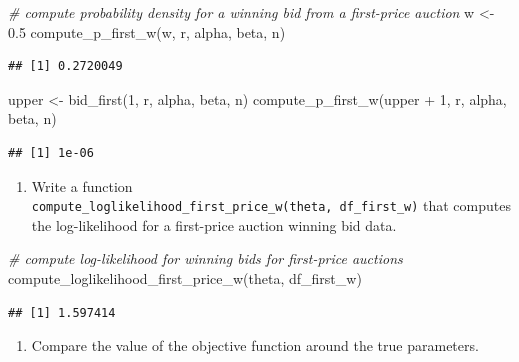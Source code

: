 \documentclass[
]{book}
\newenvironment{Shaded}{\begin{snugshade}}{\end{snugshade}}
\newcommand{\CommentTok}[1]{\textcolor[rgb]{0.56,0.35,0.01}{\textit{#1}}}
\newcommand{\DecValTok}[1]{\textcolor[rgb]{0.00,0.00,0.81}{#1}}
\newcommand{\FloatTok}[1]{\textcolor[rgb]{0.00,0.00,0.81}{#1}}
\newcommand{\FunctionTok}[1]{\textcolor[rgb]{0.00,0.00,0.00}{#1}}
\newcommand{\NormalTok}[1]{#1}
\newcommand{\OtherTok}[1]{\textcolor[rgb]{0.56,0.35,0.01}{#1}}
\newcommand{\SpecialCharTok}[1]{\textcolor[rgb]{0.00,0.00,0.00}{#1}}
\providecommand{\tightlist}{%
  \setlength{\itemsep}{0pt}\setlength{\parskip}{0pt}}
\begin{document}
\begin{Shaded}
\begin{Highlighting}[]
\CommentTok{\# compute probability density for a winning bid from a first{-}price auction}
\NormalTok{w }\OtherTok{\textless{}{-}} \FloatTok{0.5}
\FunctionTok{compute\_p\_first\_w}\NormalTok{(w, r, alpha, beta, n)}
\end{Highlighting}
\end{Shaded}

\begin{verbatim}
## [1] 0.2720049
\end{verbatim}

\begin{Shaded}
\begin{Highlighting}[]
\NormalTok{upper }\OtherTok{\textless{}{-}} \FunctionTok{bid\_first}\NormalTok{(}\DecValTok{1}\NormalTok{, r, alpha, beta, n)}
\FunctionTok{compute\_p\_first\_w}\NormalTok{(upper }\SpecialCharTok{+} \DecValTok{1}\NormalTok{, r, alpha, beta, n)}
\end{Highlighting}
\end{Shaded}

\begin{verbatim}
## [1] 1e-06
\end{verbatim}

\begin{enumerate}
\def\labelenumi{\arabic{enumi}.}
\setcounter{enumi}{6}
\tightlist
\item
  Write a function \texttt{compute\_loglikelihood\_first\_price\_w(theta,\ df\_first\_w)} that computes the log-likelihood for a first-price auction winning bid data.
\end{enumerate}

\begin{Shaded}
\begin{Highlighting}[]
\CommentTok{\# compute log{-}likelihood for winning bids for first{-}price auctions}
\FunctionTok{compute\_loglikelihood\_first\_price\_w}\NormalTok{(theta, df\_first\_w)}
\end{Highlighting}
\end{Shaded}

\begin{verbatim}
## [1] 1.597414
\end{verbatim}

\begin{enumerate}
\def\labelenumi{\arabic{enumi}.}
\setcounter{enumi}{7}
\tightlist
\item
  Compare the value of the objective function around the true parameters.
\end{enumerate}
\end{document}
